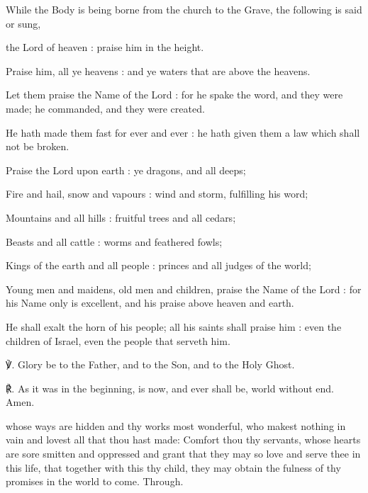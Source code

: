 \begin{rubric}
    While the Body is being borne from the church to the Grave, the following is said or sung,
\end{rubric}

 the Lord of heaven : praise him in the height.\par
{}
Praise him, all ye heavens : and ye waters that are above the heavens.\par
{}Let them praise the Name of the Lord : for he spake the word, and they were made; he commanded, and they were created.\par
{}He hath made them fast for ever and ever : he hath given them a law which shall not be broken.\par
{}Praise the Lord upon earth : ye dragons, and all deeps;\par
{}Fire and hail, snow and vapours : wind and storm, fulfilling his word;\par
{}Mountains and all hills : fruitful trees and all cedars;\par
{}Beasts and all cattle : worms and feathered fowls;\par
{}Kings of the earth and all people : princes and all judges of the world;\par
{}Young men and maidens, old men and children, praise the Name of the Lord : for his Name only is excellent, and his praise above heaven and earth.\par
{}He shall exalt the horn of his people; all his saints shall praise him : even the children of Israel, even the people that serveth him.\par
℣. Glory be to the Father, and to the Son, and to the Holy Ghost.\par
℟. As it was in the beginning, is now, and ever shall be, world without end. Amen.

 whose ways are hidden and thy works most wonderful, who makest nothing in vain and lovest all that thou hast made: Comfort thou thy servants, whose hearts are sore smitten and oppressed and grant that they may so love and serve thee in this life, that together with this thy child, they may obtain the fulness of thy promises in the world to come. Through.

